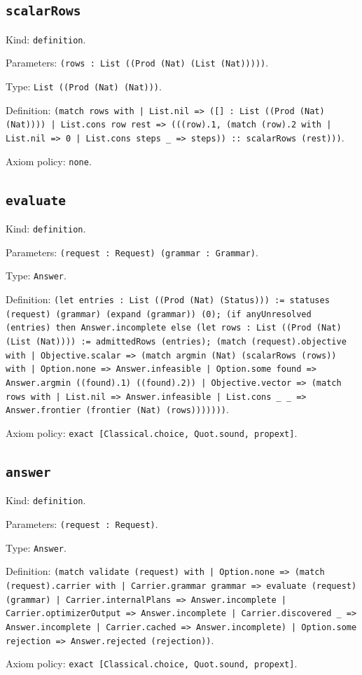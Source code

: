 \documentclass[11pt]{article}
\begin{document}
\subsection*{\texttt{scalarRows}}
\noindent Kind: \texttt{definition}.\par
\noindent Parameters: \texttt{(rows : List ((Prod (Nat) (List (Nat)))))}.\par
\noindent Type: \texttt{List ((Prod (Nat) (Nat)))}.\par
\noindent Definition: \texttt{(match rows with | List.nil => ([] : List ((Prod (Nat) (Nat)))) | List.cons row rest => (((row).1, (match (row).2 with | List.nil => 0 | List.cons steps \_ => steps)) :: scalarRows (rest)))}.\par
\noindent Axiom policy: \texttt{none}.\par
\subsection*{\texttt{evaluate}}
\noindent Kind: \texttt{definition}.\par
\noindent Parameters: \texttt{(request : Request) (grammar : Grammar)}.\par
\noindent Type: \texttt{Answer}.\par
\noindent Definition: \texttt{(let entries : List ((Prod (Nat) (Status))) := statuses (request) (grammar) (expand (grammar)) (0); (if anyUnresolved (entries) then Answer.incomplete else (let rows : List ((Prod (Nat) (List (Nat)))) := admittedRows (entries); (match (request).objective with | Objective.scalar => (match argmin (Nat) (scalarRows (rows)) with | Option.none => Answer.infeasible | Option.some found => Answer.argmin ((found).1) ((found).2)) | Objective.vector => (match rows with | List.nil => Answer.infeasible | List.cons \_ \_ => Answer.frontier (frontier (Nat) (rows)))))))}.\par
\noindent Axiom policy: \texttt{exact [Classical.choice, Quot.sound, propext]}.\par
\subsection*{\texttt{answer}}
\noindent Kind: \texttt{definition}.\par
\noindent Parameters: \texttt{(request : Request)}.\par
\noindent Type: \texttt{Answer}.\par
\noindent Definition: \texttt{(match validate (request) with | Option.none => (match (request).carrier with | Carrier.grammar grammar => evaluate (request) (grammar) | Carrier.internalPlans => Answer.incomplete | Carrier.optimizerOutput => Answer.incomplete | Carrier.discovered \_ => Answer.incomplete | Carrier.cached => Answer.incomplete) | Option.some rejection => Answer.rejected (rejection))}.\par
\noindent Axiom policy: \texttt{exact [Classical.choice, Quot.sound, propext]}.\par
\end{document}
